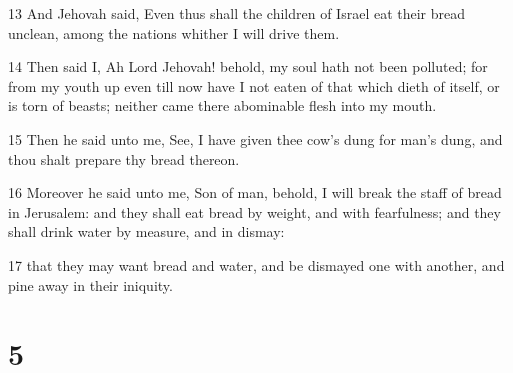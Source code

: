 \par 13 And Jehovah said, Even thus shall the children of Israel eat their bread unclean, among the nations whither I will drive them.
\par 14 Then said I, Ah Lord Jehovah! behold, my soul hath not been polluted; for from my youth up even till now have I not eaten of that which dieth of itself, or is torn of beasts; neither came there abominable flesh into my mouth.
\par 15 Then he said unto me, See, I have given thee cow's dung for man's dung, and thou shalt prepare thy bread thereon.
\par 16 Moreover he said unto me, Son of man, behold, I will break the staff of bread in Jerusalem: and they shall eat bread by weight, and with fearfulness; and they shall drink water by measure, and in dismay:
\par 17 that they may want bread and water, and be dismayed one with another, and pine away in their iniquity.

\chapter{5}

